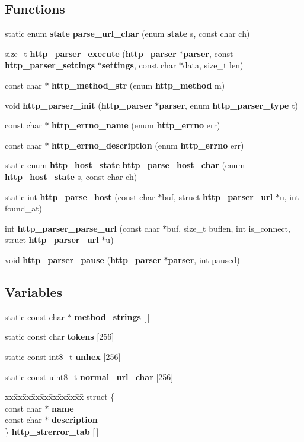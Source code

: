 \subsection*{Functions}
\begin{DoxyCompactItemize}
\item 
static enum {\bf state} {\bf parse\+\_\+url\+\_\+char} (enum {\bf state} s, const char ch)
\item 
size\+\_\+t {\bf http\+\_\+parser\+\_\+execute} ({\bf http\+\_\+parser} $\ast${\bf parser}, const {\bf http\+\_\+parser\+\_\+settings} $\ast${\bf settings}, const char $\ast$data, size\+\_\+t len)
\item 
const char $\ast$ {\bf http\+\_\+method\+\_\+str} (enum {\bf http\+\_\+method} m)
\item 
void {\bf http\+\_\+parser\+\_\+init} ({\bf http\+\_\+parser} $\ast${\bf parser}, enum {\bf http\+\_\+parser\+\_\+type} t)
\item 
const char $\ast$ {\bf http\+\_\+errno\+\_\+name} (enum {\bf http\+\_\+errno} err)
\item 
const char $\ast$ {\bf http\+\_\+errno\+\_\+description} (enum {\bf http\+\_\+errno} err)
\item 
static enum {\bf http\+\_\+host\+\_\+state} {\bf http\+\_\+parse\+\_\+host\+\_\+char} (enum {\bf http\+\_\+host\+\_\+state} s, const char ch)
\item 
static int {\bf http\+\_\+parse\+\_\+host} (const char $\ast$buf, struct {\bf http\+\_\+parser\+\_\+url} $\ast$u, int found\+\_\+at)
\item 
int {\bf http\+\_\+parser\+\_\+parse\+\_\+url} (const char $\ast$buf, size\+\_\+t buflen, int is\+\_\+connect, struct {\bf http\+\_\+parser\+\_\+url} $\ast$u)
\item 
void {\bf http\+\_\+parser\+\_\+pause} ({\bf http\+\_\+parser} $\ast${\bf parser}, int paused)
\end{DoxyCompactItemize}
\subsection*{Variables}
\begin{DoxyCompactItemize}
\item 
static const char $\ast$ {\bf method\+\_\+strings} [$\,$]
\item 
static const char {\bf tokens} [256]
\item 
static const int8\+\_\+t {\bf unhex} [256]
\item 
static const uint8\+\_\+t {\bf normal\+\_\+url\+\_\+char} [256]
\item 
\begin{tabbing}
xx\=xx\=xx\=xx\=xx\=xx\=xx\=xx\=xx\=\kill
struct \{\\
\>const char $\ast$ {\bf name}\\
\>const char $\ast$ {\bf description}\\
\} {\bf http\_strerror\_tab} [$\,$]\\

\end{tabbing}\end{DoxyCompactItemize}


